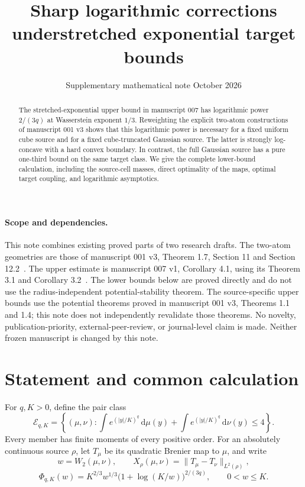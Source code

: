 \documentclass[11pt]{article}
\title{Sharp logarithmic corrections under\linebreak stretched exponential target bounds}
\author{}
\date{Supplementary mathematical note\quad 7 October 2026}
\theoremstyle{remark}\newtheorem{remark}[theorem]{Remark}
\newcommand{\norm}[1]{\lVert#1\rVert}
\newcommand{\dd}{\,\mathrm d}
\begin{document}
\maketitle
\begin{abstract}
The stretched-exponential upper bound in manuscript 007 has logarithmic
power $2/(3q)$ at Wasserstein exponent $1/3$. Reweighting the explicit
two-atom constructions of manuscript 001 v3 shows that this logarithmic
power is necessary for a fixed uniform cube source and for a fixed
cube-truncated Gaussian source. The latter is strongly log-concave with
a hard convex boundary. In contrast, the full Gaussian source has a
pure one-third bound on the same target class. We give the complete
lower-bound calculation, including the source-cell masses, direct
optimality of the maps, optimal target coupling, and logarithmic
asymptotics.
\end{abstract}

\paragraph{Scope and dependencies.}
This note combines existing proved parts of two research drafts. The
two-atom geometries are those of manuscript 001 v3, Theorem 1.7,
Section 11 and Section 12.2~\cite{M001}. The upper estimate is manuscript
007 v1, Corollary 4.1, using its Theorem 3.1 and Corollary 3.2~\cite{M007}.
The lower bounds below are proved directly and do not use the
radius-independent potential-stability theorem. The source-specific
upper bounds use the potential theorems proved in manuscript 001 v3,
Theorems 1.1 and 1.4; this note does not independently revalidate those
theorems. No novelty, publication-priority,
external-peer-review, or journal-level claim is made. Neither frozen
manuscript is changed by this note.

\section{Statement and common calculation}
For $q,K>0$, define the pair class
\[
 \mathcal E_{q,K}=
 \left\{(\mu,\nu):
 \int e^{(|y|/K)^q}\dd\mu(y)
 +\int e^{(|y|/K)^q}\dd\nu(y)\le4\right\}.
\]
Every member has finite moments of every positive order. For an
absolutely continuous source $\rho$, let $T_\mu$ be its quadratic
Brenier map to $\mu$, and write
\[
 w=W_2(\mu,\nu),\qquad
 X_\rho(\mu,\nu)=\norm{T_\mu-T_\nu}_{L^2(\rho)},
\]
\[
 \Phi_{q,K}(w)=K^{2/3}w^{1/3}
             \bigl(1+\log(K/w)\bigr)^{2/(3q)},
 \qquad 0<w\le K.
\]
\end{document}
